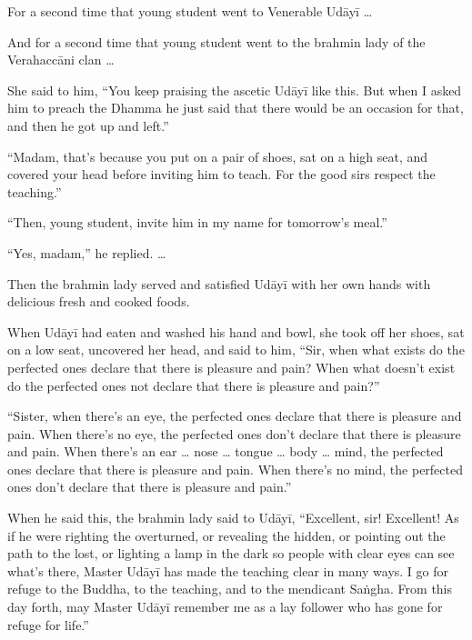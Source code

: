 \documentclass[12pt,openany]{book}%
\begin{document}
For a second time that young student went to Venerable \textsanskrit{Udāyī} … 

And for a second time that young student went to the brahmin lady of the \textsanskrit{Verahaccāni} clan … 

She said to him, “You keep praising the ascetic \textsanskrit{Udāyī} like this. But when I asked him to preach the Dhamma he just said that there would be an occasion for that, and then he got up and left.” 

“Madam, that’s because you put on a pair of shoes, sat on a high seat, and covered your head before inviting him to teach. For the good sirs respect the teaching.” 

“Then, young student, invite him in my name for tomorrow’s meal.” 

“Yes, madam,” he replied. … 

Then the brahmin lady served and satisfied \textsanskrit{Udāyī} with her own hands with delicious fresh and cooked foods. 

When \textsanskrit{Udāyī} had eaten and washed his hand and bowl, she took off her shoes, sat on a low seat, uncovered her head, and said to him, “Sir, when what exists do the perfected ones declare that there is pleasure and pain? When what doesn’t exist do the perfected ones not declare that there is pleasure and pain?” 

“Sister, when there’s an eye, the perfected ones declare that there is pleasure and pain. When there’s no eye, the perfected ones don’t declare that there is pleasure and pain. When there’s an ear … nose … tongue … body … mind, the perfected ones declare that there is pleasure and pain. When there’s no mind, the perfected ones don’t declare that there is pleasure and pain.” 

When he said this, the brahmin lady said to \textsanskrit{Udāyī}, “Excellent, sir! Excellent! As if he were righting the overturned, or revealing the hidden, or pointing out the path to the lost, or lighting a lamp in the dark so people with clear eyes can see what’s there, Master \textsanskrit{Udāyī} has made the teaching clear in many ways. I go for refuge to the Buddha, to the teaching, and to the mendicant \textsanskrit{Saṅgha}. From this day forth, may Master \textsanskrit{Udāyī} remember me as a lay follower who has gone for refuge for life.” 
\end{document}
